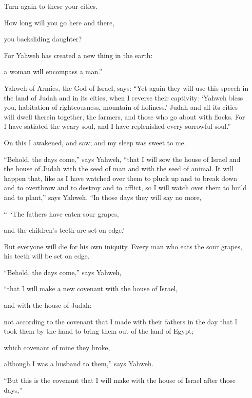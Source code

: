 {\par }{\QB Turn again to these your cities.
\par }{\Q {}How long will you go here and there,
\par }{\QB you backsliding daughter?
\par }{\Q For Yahweh has created a new thing in the earth:
\par }{\QB a woman will encompass a man.”
\par }{\BB \par }{\PP {}Yahweh of Armies, the God of Israel, says: “Yet again they will use this speech in the land of Judah and in its cities, when I reverse their captivity: ‘Yahweh bless you, habitation of righteousness, mountain of holiness.’
Judah and all its cities will dwell therein together, the farmers, and those who go about with flocks.
For I have satiated the weary soul, and I have replenished every sorrowful soul.”
\par }{\PP {}On this I awakened, and saw; and my sleep was sweet to me.
\par }{\PP {}“Behold, the days come,” says Yahweh, “that I will sow the house of Israel and the house of Judah with the seed of man and with the seed of animal.
It will happen that, like as I have watched over them to pluck up and to break down and to overthrow and to destroy and to afflict, so I will watch over them to build and to plant,” says Yahweh.
“In those days they will say no more,
\par }{\Q “ ‘The fathers have eaten sour grapes,
\par }{\QB and the children’s teeth are set on edge.’
\par }{\MM {}But everyone will die for his own iniquity. Every man who eats the sour grapes, his teeth will be set on edge.
\par }{\Q {}“Behold, the days come,” says Yahweh,
\par }{\QB “that I will make a new covenant with the house of Israel,
\par }{\QB and with the house of Judah:
\par }{\Q {}not according to the covenant that I made with their fathers in the day that I took them by the hand to bring them out of the land of Egypt;
\par }{\QB which covenant of mine they broke,
\par }{\QB although I was a husband to them,” says Yahweh.
\par }{\Q {}“But this is the covenant that I will make with the house of Israel after those days,”
}
